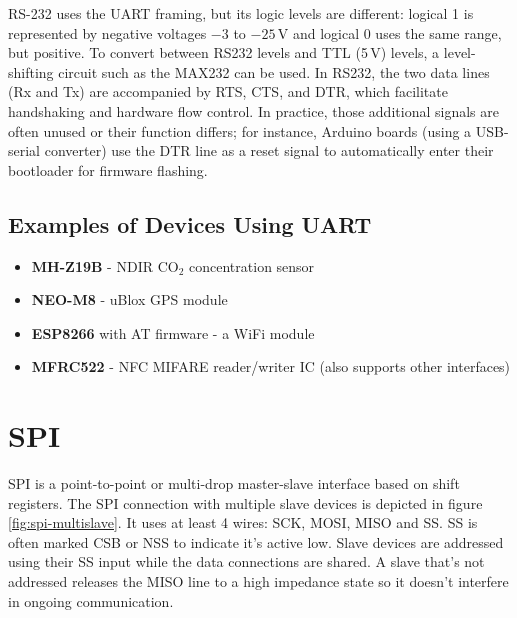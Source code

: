 RS-232 uses the \gls{UART} framing, but its logic levels are different: logical 1 is represented by negative voltages $-3$ to $-25$\,V and logical 0 uses the same range, but positive. To convert between RS232 levels and \gls{TTL} (5\,V) levels, a level-shifting circuit such as the MAX232 can be used. In RS232, the two data lines (Rx and Tx) are accompanied by \gls{RTS}, \gls{CTS}, and \gls{DTR}, which facilitate handshaking and hardware flow control. In practice, those additional signals are often unused or their function differs; for instance, Arduino boards (using a USB-serial converter) use the \gls{DTR} line as a reset signal to automatically enter their bootloader for firmware flashing.

\subsection{Examples of Devices Using UART}

\begin{itemize}
	\item \textbf{MH-Z19B} - \gls{NDIR} CO$_2$ concentration sensor
	\item \textbf{NEO-M8} - uBlox \gls{GPS} module
	\item \textbf{ESP8266} with AT firmware - a WiFi module
	\item \textbf{MFRC522} - \gls{NFC} MIFARE reader/writer \gls{IC} (also supports other interfaces)
\end{itemize}

\section{SPI} \label{sec:theory-spi}

\acrfull{SPI} is a point-to-point or multi-drop master-slave interface based on shift registers. The \gls{SPI} connection with multiple slave devices is depicted in figure \ref{fig:spi-multislave}. It uses at least 4 wires: \gls{SCK}, \gls{MOSI}, \gls{MISO} and \gls{SS}. \gls{SS} is often marked \gls{CSB} or \gls{NSS} to indicate it's active low. Slave devices are addressed using their \gls{SS} input while the data connections are shared. A slave that's not addressed releases the \gls{MISO} line to a high impedance state so it doesn't interfere in ongoing communication.

